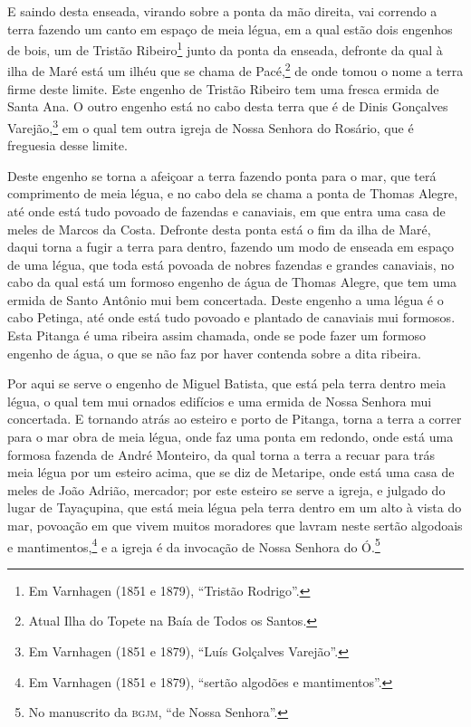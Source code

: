 \begin{linenumbers}
E saindo desta enseada, virando sobre a ponta da mão direita, vai correndo a terra fazendo
um canto em espaço de meia légua, em a qual estão dois engenhos de bois, um de Tristão
Ribeiro\footnote{ Em Varnhagen (1851 e 1879), ``Tristão Rodrigo''.} junto da ponta da
enseada, defronte da qual à ilha de Maré está um ilhéu que se chama de Pacé,\footnote{
Atual Ilha do Topete na Baía de Todos os Santos.} de onde tomou o nome a terra firme deste
limite. Este engenho de Tristão Ribeiro tem uma fresca ermida de Santa Ana. O outro
engenho está no cabo desta terra que é de Dinis Gonçalves Varejão,\footnote{ Em Varnhagen
(1851 e 1879), ``Luís Golçalves Varejão''.} em o qual tem outra igreja de Nossa Senhora do
Rosário, que é freguesia desse limite.

Deste engenho se torna a afeiçoar a terra fazendo ponta para o mar, que terá comprimento
de meia légua, e no cabo dela se chama a ponta de Thomas Alegre, até onde está tudo
povoado de fazendas e canaviais, em que entra uma casa de meles de Marcos da Costa.
Defronte desta ponta está o fim da ilha de Maré, daqui torna a fugir a terra para dentro,
fazendo um modo de enseada em espaço de uma légua, que toda está povoada de nobres
fazendas e grandes canaviais, no cabo da qual está um formoso engenho de água de Thomas
Alegre, que tem uma ermida de Santo Antônio mui bem concertada. Deste engenho a uma légua
é o cabo Petinga, até onde está tudo povoado e plantado de canaviais mui formosos. Esta
Pitanga é uma ribeira assim chamada, onde se pode fazer um formoso engenho de água, o que
se não faz por haver contenda sobre a dita ribeira.

Por aqui se serve o engenho de Miguel Batista, que está pela terra dentro meia légua, o
qual tem mui ornados edifícios e uma ermida de Nossa Senhora mui concertada. E tornando
atrás ao esteiro e porto de Pitanga, torna a terra a correr para o mar obra de meia légua,
onde faz uma ponta em redondo, onde está uma formosa fazenda de André Monteiro, da qual
torna a terra a recuar para trás meia légua por um esteiro acima, que se diz de Metaripe,
onde está uma casa de meles de João Adrião, mercador; por este esteiro se serve a igreja,
e julgado do lugar de Tayaçupina, que está meia légua pela terra dentro em um alto à vista
do mar, povoação em que vivem muitos moradores que lavram neste sertão algodoais e
mantimentos,\footnote{ Em Varnhagen (1851 e 1879), ``sertão algodões e mantimentos''.} e a
igreja é da invocação de Nossa Senhora do Ó.\footnote{ No manuscrito da \textsc{bgjm}, ``de
Nossa Senhora''.}


\end{linenumbers}
